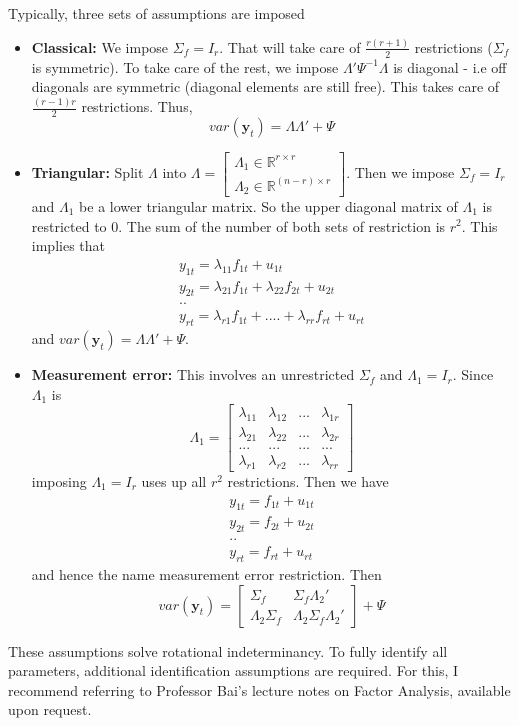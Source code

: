 \par
Typically, three sets of assumptions are imposed
\begin{itemize}
\item \textbf{Classical: } We impose $\Sigma_f = I_r$. That will take care of $\frac{r(r+1)}{2}$ restrictions ($\Sigma_f$ is symmetric). To take care of the rest, we impose $\Lambda'\Psi^{-1}\Lambda$ is diagonal - i.e off diagonals are symmetric (diagonal elements are still free). This takes care of $\frac{(r-1)r}{2}$ restrictions. Thus, 
\[
var(\mathbf{y}_t)=\Lambda\Lambda'+\Psi
\]
\item \textbf{Triangular: } Split $\Lambda$ into $\Lambda =\begin{bmatrix}\Lambda_1 \in\mathbb{R}^{r\times r}\\ \Lambda_2 \in\mathbb{R}^{(n-r)\times r}\end{bmatrix}$. Then we impose $\Sigma_f = I_r$ and $\Lambda_1$ be a lower triangular matrix. So the upper diagonal matrix of $\Lambda_1$ is restricted to 0. The sum of the number of both sets of restriction is $r^2$. This implies that
\begin{gather*}
y_{1t}= \lambda_{11}f_{1t}+u_{1t}\\
y_{2t}= \lambda_{21}f_{1t}+\lambda_{22}f_{2t}+u_{2t}\\
..\\
y_{rt}= \lambda_{r1}f_{1t}+....+\lambda_{rr}f_{rt}+u_{rt}
\end{gather*}
and $var(\mathbf{y}_t)=\Lambda\Lambda'+\Psi$. 
\item \textbf{Measurement error: } This involves an unrestricted $\Sigma_f$ and $\Lambda_1 = I_r$. Since $\Lambda_1$ is
\[
\Lambda_1= \begin{bmatrix}\lambda_{11} & \lambda_{12}& ... & \lambda_{1r}\\ \lambda_{21} & \lambda_{22}& ... & \lambda_{2r} \\ ... & ...& ... & ...\\ \lambda_{r1} & \lambda_{r2}& ... & \lambda_{rr}\end{bmatrix}
\]
imposing $\Lambda_1=I_r$ uses up all $r^2$ restrictions. Then we have
\begin{gather*}
y_{1t}= f_{1t}+u_{1t}\\
y_{2t}=f_{2t}+u_{2t}\\
..\\
y_{rt}=f_{rt}+u_{rt}
\end{gather*}
and hence the name measurement error restriction. Then 
\[
var(\mathbf{y}_t)=\begin{bmatrix}\Sigma_f & \Sigma_f\Lambda_2' \\ \Lambda_2\Sigma_f & \Lambda_2 \Sigma_f \Lambda_2' \end{bmatrix} + \Psi
\]
\end{itemize}
These assumptions solve rotational indeterminancy. To fully identify all parameters, additional identification assumptions are required. For this, I recommend referring to Professor Bai's lecture notes on Factor Analysis, available upon request. 
